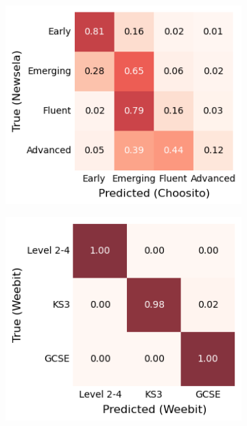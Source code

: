\documentclass[thesis.tex]{subfiles}
\begin{document}
\begin{figure}
    \hfill
    \begin{subfigure}[c]{.31\textwidth}
    \centering
    \includegraphics[width=\textwidth]{pictures/train_choosito_test_newsela.png}
    \end{subfigure}
    \newline \newline \newline
    \begin{subfigure}[c]{.31\textwidth}
    \centering
    \includegraphics[width=\textwidth]{pictures/train_weebit_test_weebit.png}

\end{subfigure}
\end{figure}
\end{document}
